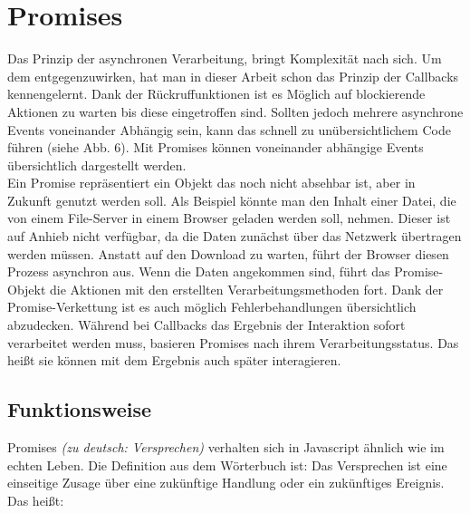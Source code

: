 \section{Promises}

Das Prinzip der asynchronen Verarbeitung, bringt Komplexität nach sich. Um dem entgegenzuwirken, hat man in dieser Arbeit schon das Prinzip der Callbacks kennengelernt. Dank der Rückruffunktionen ist es Möglich auf blockierende Aktionen zu warten bis diese eingetroffen sind. Sollten jedoch mehrere asynchrone Events voneinander Abhängig sein, kann das schnell zu unübersichtlichem Code führen (siehe Abb. 6). Mit Promises können voneinander abhängige Events übersichtlich dargestellt werden.\\

\noindent
Ein Promise repräsentiert ein Objekt das noch nicht absehbar ist, aber in Zukunft genutzt werden soll. Als Beispiel könnte man den Inhalt einer Datei, die von einem File-Server in einem Browser geladen werden soll, nehmen. Dieser ist auf Anhieb nicht verfügbar, da die Daten zunächst über das Netzwerk übertragen werden müssen. Anstatt auf den Download zu warten, führt der Browser diesen Prozess asynchron aus. Wenn die Daten angekommen sind, führt das Promise-Objekt die Aktionen mit den erstellten Verarbeitungsmethoden fort. Dank der Promise-Verkettung ist es auch möglich Fehlerbehandlungen übersichtlich abzudecken. Während bei Callbacks das Ergebnis der Interaktion sofort verarbeitet werden muss, basieren Promises nach ihrem Verarbeitungsstatus. Das heißt sie können mit dem Ergebnis auch \glqq{}später\grqq{} interagieren.

\subsection{Funktionsweise}

\noindent
Promises \textit{(zu deutsch: Versprechen)} verhalten sich in Javascript ähnlich wie im echten Leben. Die Definition aus dem Wörterbuch ist: Das Versprechen ist eine einseitige Zusage über eine zukünftige Handlung oder ein zukünftiges Ereignis. \cite{versprechen} \\

\noindent
Das heißt:

